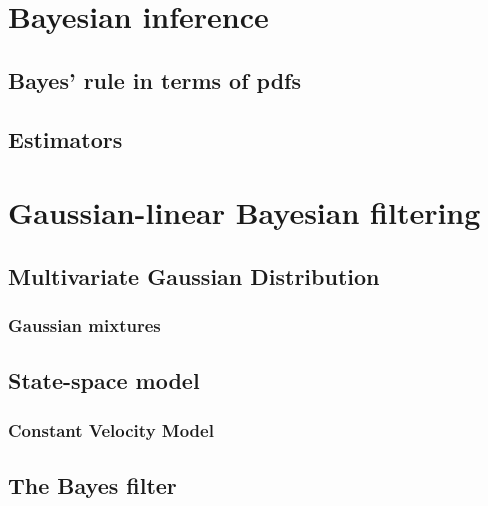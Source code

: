 \documentclass[english,master,unicode]{ctufit-thesis}
\theoremstyle{plain}
\theoremstyle{definition}
\theoremstyle{remark}
\numberwithin{theorem}{chapter}
\begin{document}
    \section{Bayesian inference}\label{sec:bayesian-inference}
        
        \subsection{Bayes' rule in terms of pdfs}\label{sec:bayes-rule-pdf}
            
        \subsection{Estimators}\label{sec:estimators}
            
    \section{Gaussian-linear Bayesian filtering}\label{sec:gauss-linear-filtering}
        
        \subsection{Multivariate Gaussian Distribution}\label{sec:multivariate-gaussian}
            
            \subsubsection{Gaussian mixtures}\label{sec:gaussian-mixtures}
                
        \subsection{State-space model}\label{sec:state-space}
            
            \subsubsection{Constant Velocity Model}\label{sec:cv-model}
                
        \subsection{The Bayes filter}\label{sec:bayes-filter}
            
\end{document}

